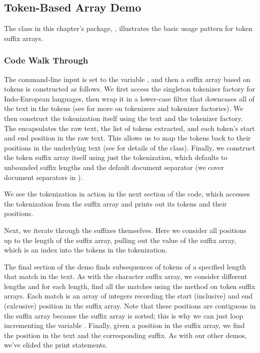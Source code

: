 \subsection{Token-Based Array Demo}

The class  in this chapter's package,
, illustrates the basic usage pattern
for token suffix arrays.  

\subsubsection{Code Walk Through}

The command-line input is set to the  variable
, and then a suffix array based on tokens is constructed as
follows.
%
%
We first access the singleton tokenizer factory for Indo-European
languages, then wrap it in a lower-case filter that downcases all of
the text in the tokens (see  for more on tokenizers
and tokenizer factories).  We then construct the tokenization itself
using the text and the tokenizer factory.  The 
encapsulates the raw text, the list of tokens extracted, and each
token's start and end position in the raw text.  This allows us to map
the tokens back to their positions in the underlying text (see
 for details of the
 class).  Finally, we construct the token suffix
array itself using just the tokenization, which defaults to unbounded
suffix lengths and the default document separator (we cover document
separators in ).

We see the tokenization in action in the next section of the code,
which accesses the tokenization from the suffix array and prints out
its tokens and their positions.
%

Next, we iterate through the suffixes themselves.
%
%
Here we consider all positions up to the length of the suffix
array, pulling out the value of the suffix array, which is
an index into the tokens in the tokenization.  

The final section of the demo finds subsequences of tokens
of a specified length that match in the text.  
%
%
As with the character suffix array, we consider different lengths and
for each length, find all the matches using the 
method on token suffix arrays.  Each match is an array of integers
recording the start (inclusive) and end (exlcusive) position in the
suffix array.  Note that these positions are contiguous in the suffix
array because the suffix array is sorted; this is why we can just loop
incrementing the variable .  Finally, given a position in the
suffix array, we find the position in the text and the corresponding
suffix.  As with our other demos, we've elided the print statements.


